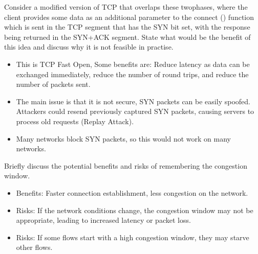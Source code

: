 \documentclass{article}
\begin{document}
\noindent Consider a modified version of TCP that overlaps these twophases, where the client provides some data as an additional parameter to the connect ()
function which is sent in the TCP segment that has the SYN bit set, with the response being
returned in the SYN+ACK segment. State what would be the benefit of this idea and discuss
why it is not feasible in practise.
\begin{itemize}
    \item This is TCP Fast Open, Some benefits are: Reduce latency as data can be exchanged immediately, reduce the number of round trips, and reduce the number of packets sent.
    \item The main issue is that it is not secure, SYN packets can be easily spoofed. Attackers could resend previously captured SYN packets, causing servers to process old requests (Replay Attack).
    \item Many networks block SYN packets, so this would not work on many networks.
\end{itemize}

Briefly discuss the potential benefits and risks of remembering the congestion window.
\begin{itemize}
    \item Benefits: Faster connection establishment, less congestion on the network.
    \item Risks: If the network conditions change, the congestion window may not be appropriate, leading to increased latency or packet loss.
    \item Risks: If some flows start with a high congestion window, they may starve other flows.
\end{itemize}
\end{document}
